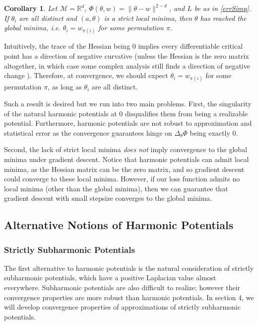 \documentclass{article}
\newtheorem{corollary}[theorem]{Corollary}
\newcommand{\R}{{\mathbb{R}}}
\begin{document}
\begin{corollary}
Let $\mathcal{M} = \R^d$, $\Phi(\theta,w) = \|\theta-w\|^{2-d}$, and $L$ be as in \eqref{errSimp}. If $\theta_i$ are all distinct and $(a,\theta)$ is a strict local minima, then $\theta$ has reached the global minima, i.e. $\theta_i = w_{\pi(i)}$ for some permutation $\pi$. 
\end{corollary}

Intuitively, the trace of the Hessian being 0 implies every differentiable critical point has a direction of negative curvative (unless the Hessian is the zero matrix altogether, in which case some complex analysis still finds a direction of negative change \cite{arnold1985mathematical}). Therefore, at convergence, we should expect $\theta_i = w_{\pi(i)}$ for some permutation $\pi$, as long as $\theta_i$ are all distinct. 

Such a result is desired but we run into two main problems. First, the singularity of the natural harmonic potentials at $0$ disqualifies them from being a realizable potential. Furthermore, harmonic potentials are not robust to approximation and statistical error as the convergence guarantees hinge on $\Delta_\theta\Phi$ being exactly 0. 

Second, the lack of strict local minima {\it does not} imply convergence to the global minima under gradient descent. Notice that harmonic potentials can admit local minima, as the Hessian matrix can be the zero matrix, and so gradient descent could converge to these local minima. However, if our loss function admits no local minima (other than the global minima), then we can guarantee that gradient descent with small stepsize converges to the global minima. 

\subsection{Alternative Notions of Harmonic Potentials}

\subsubsection{Strictly Subharmonic Potentials}

The first alternative to harmonic potentials is the natural consideration of strictly subharmonic potentials, which have a positive Laplacian value almost everywhere. Subharmonic potentials are also difficult to realize; however their convergence properties are more robust than harmonic potentials. In section 4, we will develop convergence properties of approximations of strictly subharmonic potentials.
\end{document}
